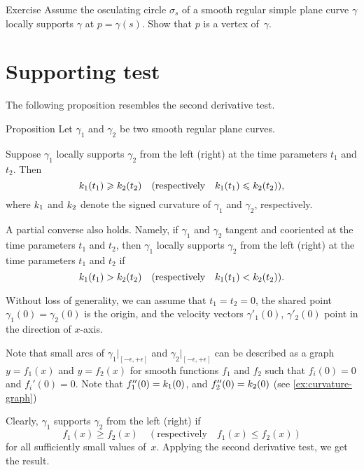 \begin{thm}{Exercise}\label{ex:vertex-support}
Assume the osculating circle $\sigma_s$ of a smooth regular simple plane curve $\gamma$ locally supports $\gamma$ at $p=\gamma(s)$.
Show that $p$ is a vertex of~$\gamma$.
\end{thm}

\section{Supporting test}

The following proposition resembles the second derivative test. 

\begin{thm}{Proposition}\label{prop:supporting-circline}
Let $\gamma_1$ and $\gamma_2$ be two smooth regular plane curves.

Suppose $\gamma_1$ locally supports $\gamma_2$ from the left (right) at the time parameters $t_1$ and $t_2$.
Then 
\[k_1(t_1)\geqslant k_2(t_2)\quad(\text{respectively}\quad k_1(t_1)\leqslant k_2(t_2)),\]
where $k_1$ and $k_2$ denote the signed curvature of $\gamma_1$ and $\gamma_2$, respectively.

A partial converse also holds.
Namely, if $\gamma_1$ and $\gamma_2$ tangent and cooriented at the time parameters $t_1$ and $t_2$,
then $\gamma_1$ locally supports $\gamma_2$ from the left (right) at the time parameters $t_1$ and $t_2$
if 
\[k_1(t_1)> k_2(t_2)\quad(\text{respectively}\quad k_1(t_1)< k_2(t_2)).\]

\end{thm}

 Without loss of generality, we can assume that $t_1=t_2=0$, the shared point $\gamma_1(0)=\gamma_2(0)$ is the origin, and the velocity vectors $\gamma'_1(0)$, $\gamma'_2(0)$ point in the direction of $x$-axis.

Note that small arcs of $\gamma_1|_{[-\epsilon,+\epsilon]}$ and  $\gamma_2|_{[-\epsilon,+\epsilon]}$ can be described as a graph 
$y=f_1(x)$ and $y=f_2(x)$ for smooth functions $f_1$ and $f_2$ such that $f_i(0)=0$ and $f_i'(0)=0$.
Note that $f_1''(0)=k_1(0)$, and $f_2''(0)=k_2(0)$ (see \ref{ex:curvature-graph})

Clearly, $\gamma_1$ supports $\gamma_2$ from the left (right) if 
\[f_1(x)\ge f_2(x)\quad(\text{respectively}\quad f_1(x)\le f_2(x))\]
for all sufficiently small values of~$x$.
Applying the second derivative test, we get the result.
\qeds


